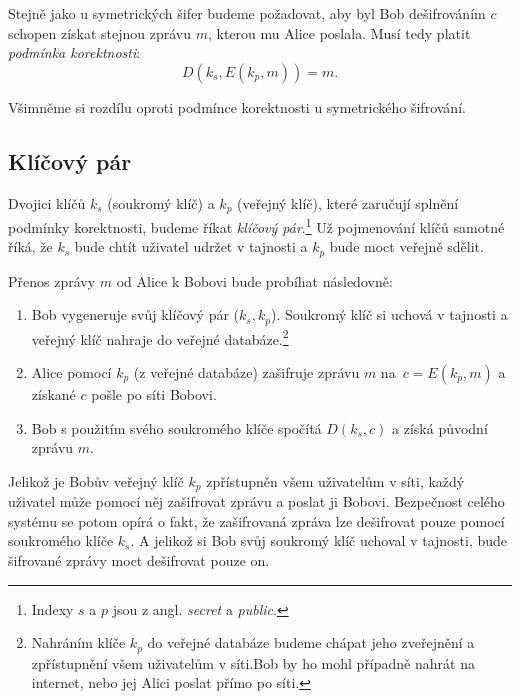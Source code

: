 \documentclass[
  program=infoi,
  biblatex=false,
  figures=true,
  glossaries,
  tables=false,
  sourcecodes=true,
  index
]{kidiplom}
\begin{document}
    Stejně jako u symetrických šifer budeme požadovat, aby byl Bob dešifrováním $c$ schopen získat stejnou zprávu $m$,
    kterou mu Alice poslala.
    Musí tedy platit \emph{podmínka korektnosti}:
    \[
        D(k_s, E(k_p, m))=m.
    \]

    \begin{remark}
        Všimněme si rozdílu oproti podmínce korektnosti u symetrického šifrování.
    \end{remark}


\subsection{Klíčový pár}\label{sub:key-pair}

    Dvojici klíčů $k_s$ (soukromý klíč) a $k_p$ (veřejný klíč), které zaručují splnění podmínky korektnosti,
    budeme říkat \emph{klíčový pár}.\footnote{Indexy $s$ a $p$ jsou z angl. \emph{secret} a \emph{public}.}
    Už pojmenování klíčů samotné říká, že $k_s$ bude chtít uživatel udržet v tajnosti a $k_p$ bude moct veřejně sdělit.

    Přenos zprávy $m$ od Alice k Bobovi bude probíhat následovně:

    \begin{enumerate}
        \item
            Bob vygeneruje svůj klíčový pár ($k_s, k_p$).
            Soukromý klíč si uchová v tajnosti a veřejný klíč nahraje do veřejné databáze.\footnote{Nahráním
            klíče $k_p$ do veřejné databáze budeme chápat jeho zveřejnění a zpřístupnění všem uživatelům v síti.Bob by ho mohl případně nahrát na internet, nebo jej Alici poslat přímo po síti.}
        \item
            Alice pomocí $k_p$ (z veřejné databáze)
            zašifruje zprávu $m$ na~$c=E(k_p, m)$ a získané $c$ pošle po síti Bobovi.
        \item 
            Bob s použitím svého soukromého klíče spočítá $D(k_s, c)$ a získá původní zprávu $m$.
    \end{enumerate}

    Jelikož je Bobův veřejný klíč $k_p$ zpřístupněn všem uživatelům v síti, každý
    uživatel může pomocí něj zašifrovat zprávu a poslat ji Bobovi.
    Bezpečnost celého systému se potom opírá o fakt, že zašifrovaná zpráva lze dešifrovat pouze pomocí soukromého klíče $k_s$.
    A jelikož si Bob svůj soukromý klíč uchoval v tajnosti, bude šifrované zprávy moct dešifrovat pouze on.
\end{document}
